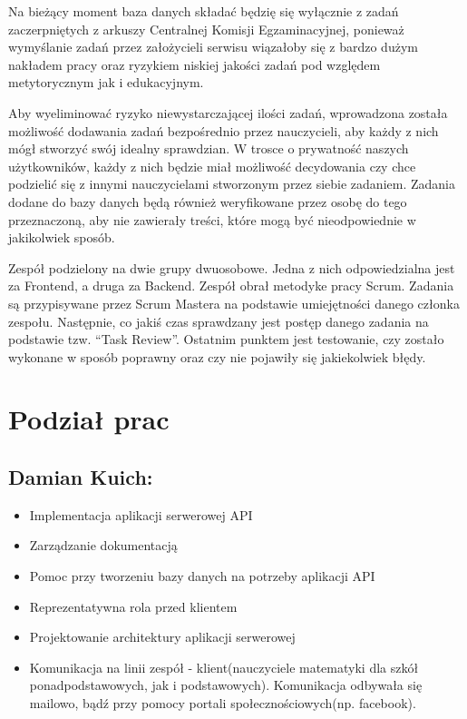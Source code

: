 \documentclass[oneside,polski,logo,indent]{amuthesis}
\begin{document}
Na bieżący moment baza danych składać będzię się wyłącznie z zadań zaczerpniętych z arkuszy Centralnej Komisji Egzaminacyjnej, ponieważ wymyślanie zadań przez założycieli serwisu wiązałoby się z bardzo dużym nakładem pracy oraz ryzykiem niskiej jakości zadań pod względem metytorycznym jak i edukacyjnym. 

Aby wyeliminować ryzyko niewystarczającej ilości zadań, wprowadzona została możliwość dodawania zadań bezpośrednio przez nauczycieli, aby każdy z nich mógł stworzyć swój idealny sprawdzian. W trosce o prywatność naszych użytkowników, każdy z nich będzie miał możliwość decydowania czy chce podzielić się z innymi nauczycielami stworzonym przez siebie zadaniem. Zadania dodane do bazy danych będą również weryfikowane przez osobę do tego przeznaczoną, aby nie zawierały treści, które mogą być nieodpowiednie w jakikolwiek sposób.

Zespół podzielony na dwie grupy dwuosobowe. Jedna z nich odpowiedzialna jest za Frontend, a druga za Backend. Zespół obrał metodyke pracy Scrum. Zadania są przypisywane przez Scrum Mastera na podstawie umiejętności danego członka zespołu. Następnie, co jakiś czas sprawdzany jest postęp danego zadania na podstawie tzw. “Task Review”. Ostatnim punktem jest testowanie, czy zostało wykonane w sposób poprawny oraz czy nie pojawiły się jakiekolwiek błędy.


\section{Podział prac}

\subsection{Damian Kuich:}
\begin{itemize}
\item Implementacja aplikacji serwerowej API
\item Zarządzanie dokumentacją
\item Pomoc przy tworzeniu bazy danych na potrzeby aplikacji API
\item Reprezentatywna rola przed klientem
\item Projektowanie architektury aplikacji serwerowej
\item Komunikacja na linii zespół - klient(nauczyciele matematyki dla szkół ponadpodstawowych, jak i podstawowych). Komunikacja odbywała się mailowo, bądź przy pomocy portali społecznościowych(np. facebook).
\end{itemize}
\end{document}
